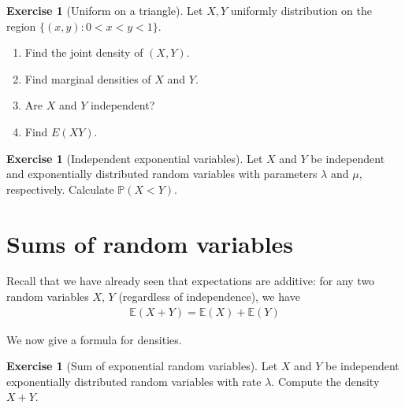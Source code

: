\documentclass[11pt]{article}
\theoremstyle{definition}
\newtheorem{exercise}[]{Exercise}
\renewcommand{\P}{\mathbb{P}}
\newcommand{\E}{\mathbb{E}}
\begin{document}
\begin{exercise}[Uniform on a triangle]
Let $X, Y$ uniformly distribution on the region
$\{(x, y) : 0 < x < y < 1\}$.
\begin{enumerate}[label = (\alph*)]
  \item Find the joint density of $(X, Y)$.
  \item Find marginal densities of $X$ and $Y$.
  \item Are $X$ and $Y$ independent?
  \item Find $E(XY)$.
\end{enumerate}
\end{exercise}


\begin{exercise}[Independent exponential variables]
Let $X$ and $Y$ be independent and exponentially
distributed random variables with parameters $\lambda$ and $\mu$, respectively. Calculate $\P(X<Y)$.
\end{exercise}

\section{Sums of random variables}

Recall that we have already seen that expectations are additive: for any two random variables $X$, $Y$
(regardless of independence), we have
\begin{align*}
  \E(X + Y) = \E(X) + \E(Y)
\end{align*}

We now give a formula for densities.


\begin{exercise}[Sum of exponential random variables]
Let $X$ and $Y$ be independent exponentially distributed
random variables with rate $\lambda$. Compute
the density $X + Y$.
\end{exercise}
\end{document}
